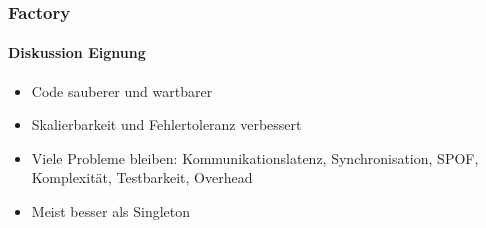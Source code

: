 \begin{frame}
  \frametitle{Factory}
  \framesubtitle{Diskussion Eignung}
  \begin{itemize}
    \item Code sauberer und wartbarer
    \item Skalierbarkeit und Fehlertoleranz verbessert
    \item Viele Probleme bleiben: Kommunikationslatenz, Synchronisation, SPOF, Komplexität, Testbarkeit, Overhead
    \item Meist besser als Singleton
  \end{itemize}
\end{frame}